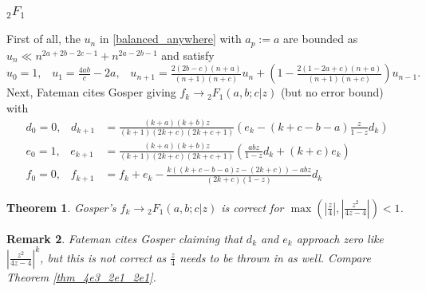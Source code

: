 \documentclass[12pt]{article}
\numberwithin{equation}{section}
\newtheorem{theorem}{Theorem}[section]
\newtheorem{remark}[theorem]{Remark}
\newcommand{\Head}[3] {{}_{#1}{#2}_{#3}}
\begin{document}
\subsubsection{$\Head{2}{F}{1}$}
First of all, the $u_n$ in \eqref{balanced_anywhere} with $a_p:=a$ are bounded as $u_n \ll n^{2a+2b-2c-1} + n^{2a-2b-1}$ and satisfy
\begin{equation*}
u_0 = 1\text{,} \quad u_1 = \tfrac{4ab}{c}-2a\text{,} \quad 
u_{n+1} = \tfrac{2(2b-c)(n+a)}{(n+1)(n+c)} u_n + (1-\tfrac{2(1-2a+c)(n+a)}{(n+1)(n+c)}) u_{n-1}\text{.}
\end{equation*}
Next, Fateman cites Gosper giving $f_k \to \Head{2}{F}{1}(a,b;c|z)$ (but no error bound) with 
\begin{equation*}
\begin{aligned}
d_0 = 0\text{,} \quad d_{k+1} & = \tfrac{(k+a)(k+b)z}{(k+1)(2k+c)(2k+c+1)}(e_k-(k+c-b-a)\tfrac{z}{1-z} d_k)\\
e_0 =1\text{,} \quad e_{k+1} & = \tfrac{(k+a)(k+b)z}{(k+1)(2k+c)(2k+c+1)}(\tfrac{a b z}{1-z} d_k+(k+c) e_k)\\
f_0 = 0\text{,} \quad f_{k+1} &= f_{k} + e_k - \tfrac{k((k+c-b-a)z-(2k+c))-a b z}{(2k+c)(1-z)} d_k
\end{aligned}
\end{equation*}
\begin{theorem}
Gosper's $f_k \to \Head{2}{F}{1}(a,b;c|z)$ is correct for $\max(|\frac{z}{4}|,|\frac{z^2}{4z-4}|)<1$.
\end{theorem}
\begin{remark}
Fateman cites Gosper claiming that $d_k$ and $e_k$ approach zero like $|\frac{z^2}{4z-4}|^k$, but this is not correct as $\frac{z}{4}$ needs to be thrown in as well. Compare Theorem \ref{thm_4e3_2e1_2e1}.
\end{remark}
\end{document}
